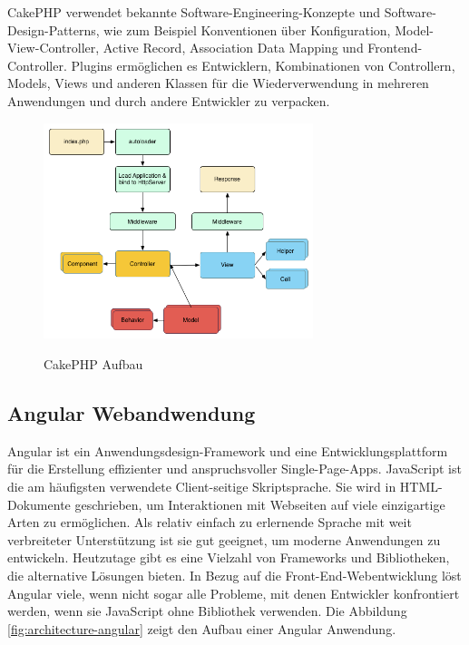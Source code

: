 \documentclass[12pt]{article}
\begin{document}
CakePHP verwendet bekannte Software-Engineering-Konzepte und Software-Design-Patterns, wie zum Beispiel Konventionen über Konfiguration, Model-View-Controller, Active Record, Association Data Mapping und Frontend-Controller. Plugins ermöglichen es Entwicklern, Kombinationen von Controllern, Models, Views und anderen Klassen für die Wiederverwendung in mehreren Anwendungen und durch andere Entwickler zu verpacken. 
\begin{figure}[h!]
    \caption{CakePHP Aufbau}
    \centering
    \includegraphics[width=0.7\textwidth]{architecture-cakephp.png}
    \label{fig:architecture-cakephp}
\end{figure}
        
        \subsection{Angular Webandwendung}

Angular ist ein Anwendungsdesign-Framework und eine Entwicklungsplattform für die Erstellung effizienter und anspruchsvoller Single-Page-Apps. JavaScript ist die am häufigsten verwendete Client-seitige Skriptsprache. Sie wird in HTML-Dokumente geschrieben, um Interaktionen mit Webseiten auf viele einzigartige Arten zu ermöglichen. Als relativ einfach zu erlernende Sprache mit weit verbreiteter Unterstützung ist sie gut geeignet, um moderne Anwendungen zu entwickeln. Heutzutage gibt es eine Vielzahl von Frameworks und Bibliotheken, die alternative Lösungen bieten. In Bezug auf die Front-End-Webentwicklung löst Angular viele, wenn nicht sogar alle Probleme, mit denen Entwickler konfrontiert werden, wenn sie JavaScript ohne Bibliothek verwenden. Die Abbildung \ref{fig:architecture-angular} zeigt den Aufbau einer Angular Anwendung. 
\end{document}
